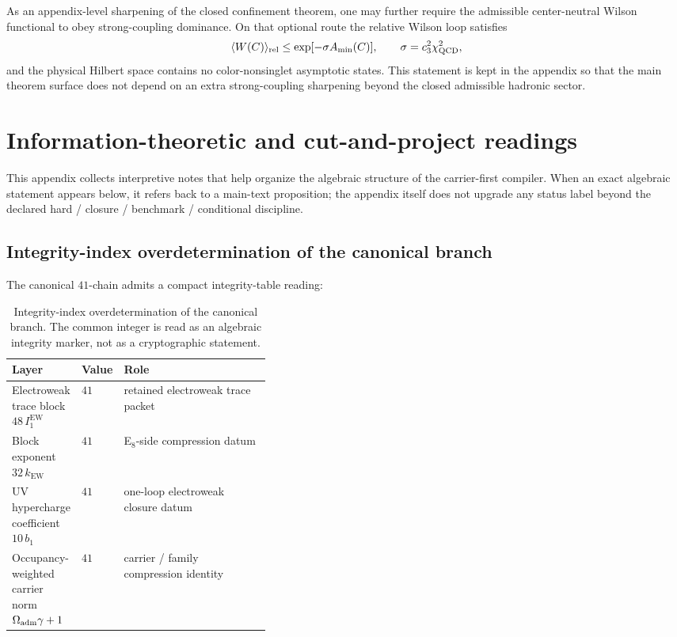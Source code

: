 As an appendix-level sharpening of the closed confinement theorem, one may further require the
admissible center-neutral Wilson functional to obey strong-coupling dominance. On that optional
route the relative Wilson loop satisfies
\[
\langle W(C)\rangle_{\mathrm{rel}}
\le
\exp[-\sigma A_{\min}(C)],
\qquad
\sigma=c_3^2\chi_{\mathrm{QCD}}^2,
\]
and the physical Hilbert space contains no color-nonsinglet asymptotic states. This statement is
kept in the appendix so that the main theorem surface does not depend on an extra strong-coupling
sharpening beyond the closed admissible hadronic sector.

\section{Information-theoretic and cut-and-project readings}
\label{app:info-readings}

This appendix collects interpretive notes that help organize the algebraic structure of the carrier-first compiler. When an exact algebraic statement appears below, it refers back to a main-text proposition; the appendix itself does not upgrade any status label beyond the declared hard / closure / benchmark / conditional discipline.

\subsection{Integrity-index overdetermination of the canonical branch}

The canonical $41$-chain admits a compact integrity-table reading:

\begin{table}[H]
\centering
\small
\begin{tabularx}{\linewidth}{@{}>{\raggedright\arraybackslash}p{0.26\linewidth}>{\raggedleft\arraybackslash}p{0.12\linewidth}Y@{}}
\toprule
Layer & Value & Role \\
\midrule
Electroweak trace block $48\,I_1^{\mathrm{EW}}$ & $41$ & retained electroweak trace packet \\
Block exponent $32\,k_{\mathrm{EW}}$ & $41$ & E$_8$-side compression datum \\
UV hypercharge coefficient $10\,b_1$ & $41$ & one-loop electroweak closure datum \\
Occupancy-weighted carrier norm $\Omega_{\mathrm{adm}}\gamma+1$ & $41$ & carrier / family compression identity \\
\bottomrule
\end{tabularx}
\caption{Integrity-index overdetermination of the canonical branch. The common integer is read as an algebraic integrity marker, not as a cryptographic statement.}
\label{tab:checksum-41}
\end{table}

